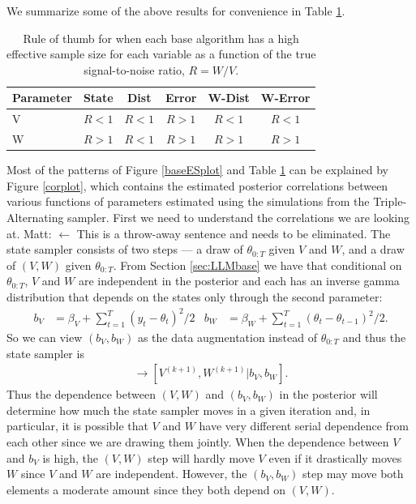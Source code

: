 \documentclass{article}
\newcommand{\matt}[1]{{\color{red} Matt: #1}}
\begin{document}
We summarize some of the above results for convenience in Table \ref{tab:stnmix}.
\begin{table}
  \centering
  \begin{tabular}{|l|ccccc|}\hline
    Parameter & State & Dist & Error & W-Dist & W-Error \\\hline
    V & $R < 1$ & $R < 1$ & $R > 1$ & $R < 1$ & $R < 1$\\
    W & $R > 1$ & $R < 1$ & $R > 1$ & $R > 1$ & $R > 1$ \\\hline
  \end{tabular}
  \caption{Rule of thumb for when each base algorithm has a high effective sample size for each variable as a function of the true signal-to-noise ratio, $R=W/V$.}
  \label{tab:stnmix}
\end{table}
Most of the patterns of Figure \ref{baseESplot} and Table \ref{tab:stnmix} can be explained by Figure \ref{corplot}, which contains the estimated posterior correlations between various functions of parameters estimated using the simulations from the Triple-Alternating sampler. First we need to understand the correlations we are looking at. \matt{$\leftarrow$ This is a throw-away sentence and needs to be eliminated.} The state sampler consists of two steps --- a draw of $\theta_{0:T}$ given $V$ and $W$, and a draw of $(V,W)$ given $\theta_{0:T}$. From Section \ref{sec:LLMbase} we have that conditional on $\theta_{0:T}$, $V$ and $W$ are independent in the posterior and each has an inverse gamma distribution that depends on the states only through the second parameter:
\begin{align*}
  b_V &= \beta_V + \sum_{t=1}^T(y_t - \theta_t)^2/2 &
  b_W &= \beta_W + \sum_{t=1}^T(\theta_t - \theta_{t-1})^2/2.
\end{align*}
So we can view $(b_V,b_W)$ as the data augmentation instead of $\theta_{0:T}$ and thus the state sampler is
\begin{align*}
  [b_V, b_W|V^{(k)},W^{(k)}] \to [V^{(k+1)},W^{(k+1)}|b_V,b_W].
\end{align*}
Thus the dependence between $(V,W)$ and $(b_V,b_W)$ in the posterior will determine how much the state sampler moves in a given iteration and, in particular, it is possible that $V$ and $W$ have very different serial dependence from each other since we are drawing them jointly. When the dependence between $V$ and $b_V$ is high, the $(V,W)$ step will hardly move $V$ even if it drastically moves $W$ since $V$ and $W$ are independent. However, the $(b_V,b_W)$ step may move both elements a moderate amount since they both depend on $(V,W)$.
\end{document}
